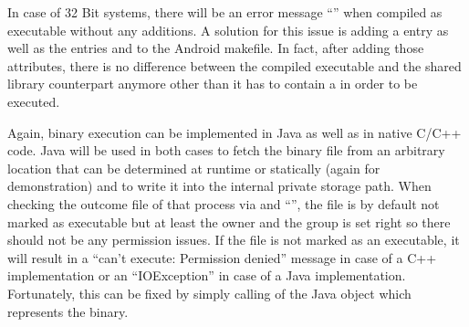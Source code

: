 In case of 32 Bit systems, there will be an error message
``'' when
compiled as executable without any additions. A solution for this issue is
adding a  entry  as well as the 
entries  and  to the Android makefile. In fact, after adding
those attributes, there is no difference between the compiled executable
and the shared library counterpart anymore other than it has to contain a
 in order to be executed.

Again, binary execution can be implemented in Java as well as in native C/C++ code.
Java will be used in both cases to fetch the binary file from an arbitrary location that can be determined at runtime or statically (again 
for demonstration) and to write it into the internal private storage path. When checking the outcome file of that process via  and ``'', the file is by default not marked as executable but at least the owner and the group is set right so there
should not be any permission issues.
If the file is not marked as an executable, it will result in a ``can't execute: Permission denied'' message in case of a C++ implementation or an ``IOException'' in case of a Java implementation. Fortunately, this can be fixed by simply calling 
of the Java  object which represents the binary.

